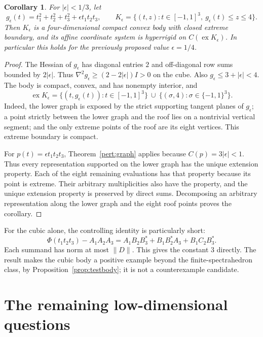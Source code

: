 \documentclass[11pt,letterpaper]{amsart}
\newtheorem{corollary}[theorem]{Corollary}
\theoremstyle{definition}
\theoremstyle{remark}
\numberwithin{equation}{section}
\DeclareMathOperator{\ex}{ex}
\begin{document}
\begin{corollary}\label{pert:cubic}
For $|\epsilon|<1/3$, let
\[
 g_\epsilon(t)=t_1^2+t_2^2+t_3^2+\epsilon t_1t_2t_3,
 \qquad
 K_\epsilon=\{(t,z):t\in[-1,1]^3,\ g_\epsilon(t)\leq z\leq4\}.
\]
Then $K_\epsilon$ is a four-dimensional compact convex body with
closed extreme boundary, and its affine coordinate system is
hyperrigid on $C(\ex K_\epsilon)$. In particular this holds for the
previously proposed value $\epsilon=1/4$.
\end{corollary}
\begin{proof}
The Hessian of $g_\epsilon$ has diagonal entries $2$ and off-diagonal
row sums bounded by $2|\epsilon|$. Thus
$\nabla^2g_\epsilon\geq(2-2|\epsilon|)I>0$ on the cube.
Also $g_\epsilon\leq3+|\epsilon|<4$. The body is compact, convex,
and has nonempty interior, and
\[
 \ex K_\epsilon=
 \{(t,g_\epsilon(t)):t\in[-1,1]^3\}
 \ \cup\ \{(\sigma,4):\sigma\in\{-1,1\}^3\}.
\]
Indeed, the lower graph is exposed by the strict supporting tangent
planes of $g_\epsilon$; a point strictly between the lower graph and
the roof lies on a nontrivial vertical segment; and the only extreme
points of the roof are its eight vertices. This extreme boundary is
compact.

For $p(t)=\epsilon t_1t_2t_3$, Theorem~\ref{pert:graph} applies because
$C(p)=3|\epsilon|<1$. Thus every representation supported on the
lower graph has the unique extension property. Each of the eight
remaining evaluations has that property because its point is extreme.
Their arbitrary multiplicities also have the property, and the unique
extension property is preserved by direct sums. Decomposing an
arbitrary representation along the lower graph and the eight roof
points proves the corollary.
\end{proof}

For the cubic alone, the controlling identity is particularly short:
\[
 \Phi(t_1t_2t_3)-A_1A_2A_3
 =A_1B_2B_3^*+B_1B_2^*A_3+B_1C_2B_3^*.
\]
Each summand has norm at most $\|D\|$. This gives the constant $3$
directly. The result makes the cubic body a positive example beyond
the finite-spectrahedron class, by Proposition~\ref{prop:testbody};
it is not a counterexample candidate.



\section{The remaining low-dimensional questions}
\label{sec:questions}
\end{document}

